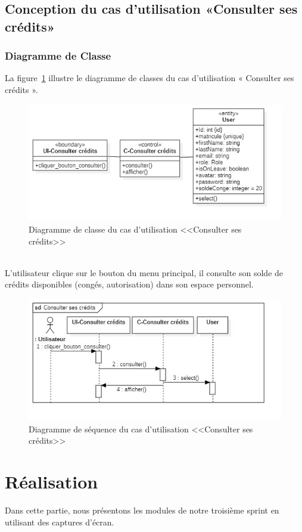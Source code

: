 \subsection{Conception du cas d’utilisation «Consulter ses crédits»}
\subsubsection{Diagramme de Classe}
La figure~\ref{fig:c_cscred} illustre le diagramme de classes du cas d'utilisation « Consulter ses crédits ».
\begin{figure}[h]
     \centering
     \includegraphics[width=14cm]{images/c_cscred.jpg}
     \caption{Diagramme de classe du cas d'utilisation <<Consulter ses crédits>>}
     \label{fig:c_cscred}
\end{figure}\\
L'utilisateur clique sur le bouton du menu principal, il consulte son solde de crédits disponibles (congés, autorisation) dans son espace personnel.
\begin{figure}[ht]
    \centering
    \includegraphics[width=13cm, height=0.8\textheight, keepaspectratio]{images/s_cscred.jpg}
    \caption{Diagramme de séquence du cas d'utilisation <<Consulter ses crédits>>}
    \label{fig:S_cscred}
\end{figure}
\newpage
\section{Réalisation}
Dans cette partie, nous présentons les modules de notre troisième sprint en utilisant des captures d’écran.

